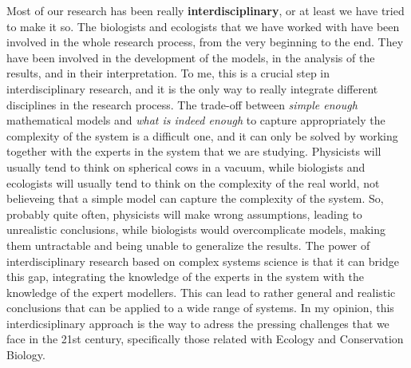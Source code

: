 Most of our research has been really \textbf{interdisciplinary}, or at least
we have tried to make it so. The biologists and ecologists that we have worked
with have been involved in the whole research process, from the very beginning
to the end. They have been involved in the development of the models, in the
analysis of the results, and in their interpretation. To me, this
is a crucial step in interdisciplinary research, and it is the only way to
really integrate different disciplines in the research process. The trade-off
between \textit{simple enough} mathematical models and \textit{what is indeed
    enough} to capture appropriately the complexity of the system is a
difficult one, and it can only be solved by working together with the experts
in the system that we are studying. Physicists will usually tend to think on
spherical cows in a vacuum, while biologists and ecologists will usually tend
to think on the complexity of the real world, not believeing that a simple
model can capture the complexity of the system. So, probably quite often,
physicists will make wrong assumptions, leading to unrealistic conclusions,
while biologists would overcomplicate models, making them untractable and being
unable to generalize the results. The power of interdisciplinary research based
on complex systems science is that it can bridge this gap, integrating the
knowledge of the experts in the system with the knowledge of the expert
modellers. This can lead to rather general and realistic conclusions that can
be applied to a wide range of systems. In my opinion, this interdicsiplinary
approach is the way to adress the pressing challenges that we face in the 21st
century, specifically those related with Ecology and Conservation Biology.


